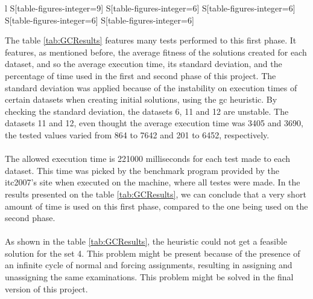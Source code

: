 \begin{table}[t]
\begin{tabular}{%
	 l%
     S[table-figures-integer=9]%
     S[table-figures-integer=6]%
     S[table-figures-integer=6]%
     S[table-figures-integer=6]%
     S[table-figures-integer=6]%
    }
\bottomrule

\end{tabular}

\caption{Some of the Graph Coloring's performance features.}
\label{tab:GCResults}

\end{table}The table \ref{tab:GCResults} features many tests performed to this first phase. It features, as mentioned before, the average fitness of the solutions created for each dataset, and so the average execution time, its standard deviation, and the percentage of time used in the first and second phase of this project. The standard deviation was applied because of the instability on execution times of certain datasets when creating initial solutions, using the \gls{gc} heuristic. By checking the standard deviation, the datasets 6, 11 and 12 are unstable. The datasets 11 and 12, even thought the average execution time was 3405 and 3690, the tested values varied from 864 to 7642 and 201 to 6452, respectively.\\
\\
The allowed execution time is 221000 milliseconds for each test made to each dataset. This time was picked by the benchmark program provided by the \gls{itc2007}'s site \cite{McCollum2007e} when executed on the machine, where all testes were made. In the results presented on the table \ref{tab:GCResults}, we can conclude that a very short amount of time is used on this first phase, compared to the one being used on the second phase.\\
\\
As shown in the table \ref{tab:GCResults}, the heuristic could not get a feasible solution for the set 4. This problem might be present because of the presence of an infinite cycle of normal and forcing assignments, resulting in assigning and unassigning the same examinations. This problem might be solved in the final version of this project.